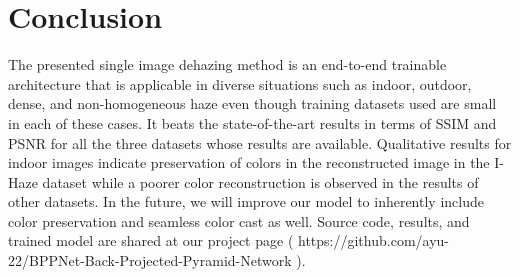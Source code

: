 \documentclass[runningheads]{llncs}
\begin{document}
\section{Conclusion}\label{sec:conclusion}
The presented single image dehazing method is an end-to-end trainable architecture that is applicable in diverse situations such as indoor, outdoor, dense, and non-homogeneous haze even though training datasets used are small in each of these cases. It beats the state-of-the-art results in terms of SSIM and PSNR for all the three datasets whose results are available. Qualitative results for indoor images indicate preservation of colors in the reconstructed image in the I-Haze dataset while a poorer color reconstruction is observed in the results of other datasets. In the future, we will improve our model to inherently include color preservation and seamless color cast as well. Source code, results, and trained model are shared at our project page ( https://github.com/ayu-22/BPPNet-Back-Projected-Pyramid-Network ).




\clearpage


\end{document}
